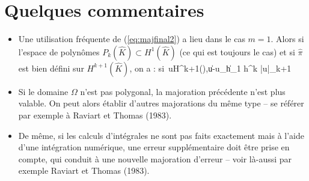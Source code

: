 \section{Quelques commentaires}
%
%
\begin{itemize}
\item
Une utilisation fr\'equente de (\ref{eq:majfinal2}) a lieu dans le cas $m=1$. Alors si l'espace de polyn\^omes $P_k(\hat{K})\subset H^1(\hat{K})$ (ce qui est toujours le cas) et si $\hat{\pi}$ est bien d\'efini sur $H^{k+1}(\hat{K})$, on a :
\be
\hbox{si }u\in H^{k+1}(\Omega),\quad \|u-u_h\|_1  \; h^k \; |u|_{k+1}
\ee
%
\item Si le domaine $\Omega$ n'est pas polygonal, la majoration pr\'ec\'edente n'est plus valable. On peut alors \'etablir d'autres majorations du m\^eme type -- se r\'ef\'erer par exemple \`a Raviart et Thomas (1983).
%
\item De m\^eme, si les calculs d'int\'egrales ne sont pas faits exactement mais \`a l'aide d'une int\'egration num\'erique, une erreur suppl\'ementaire doit \^etre prise en compte, qui conduit \`a une nouvelle majoration d'erreur -- voir l\`a-aussi par exemple Raviart et Thomas (1983).
\end{itemize}
